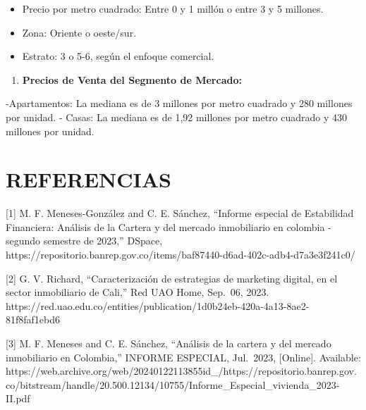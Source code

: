 \documentclass[conference,final,]{IEEEtran}
\providecommand{\tightlist}{%
  \setlength{\itemsep}{0pt}\setlength{\parskip}{0pt}}
\begin{document}
\begin{itemize}
\tightlist
\item
  Precio por metro cuadrado: Entre 0 y 1 millón o entre 3 y 5 millones.
\item
  Zona: Oriente o oeste/sur.
\item
  Estrato: 3 o 5-6, según el enfoque comercial.
\end{itemize}

\begin{enumerate}
\def\labelenumi{\arabic{enumi}.}
\setcounter{enumi}{2}
\tightlist
\item
  \textbf{Precios de Venta del Segmento de Mercado:}
\end{enumerate}

-Apartamentos: La mediana es de 3 millones por metro cuadrado y 280
millones por unidad. - Casas: La mediana es de 1,92 millones por metro
cuadrado y 430 millones por unidad.

\section{REFERENCIAS}\label{references}

{[}1{]} M. F. Meneses-González and C. E. Sánchez, ``Informe especial de
Estabilidad Financiera: Análisis de la Cartera y del mercado
inmobiliario en colombia - segundo semestre de 2023,'' DSpace,
https://repositorio.banrep.gov.co/items/baf87440-d6ad-402c-adb4-d7a3e3f241c0/

{[}2{]} G. V. Richard, ``Caracterización de estrategias de marketing
digital, en el sector inmobiliario de Cali,'' Red UAO Home, Sep.~06,
2023.
https://red.uao.edu.co/entities/publication/1d0b24eb-420a-4a13-8ae2-81f8faf1ebd6

{[}3{]} M. F. Meneses and C. E. Sánchez, ``Análisis de la cartera y del
mercado inmobiliario en Colombia,'' INFORME ESPECIAL, Jul.~2023,
{[}Online{]}. Available:
https://web.archive.org/web/20240122113855id\_/https://repositorio.banrep.gov.co/bitstream/handle/20.500.12134/10755/Informe\_Especial\_vivienda\_2023-II.pdf
\end{document}

